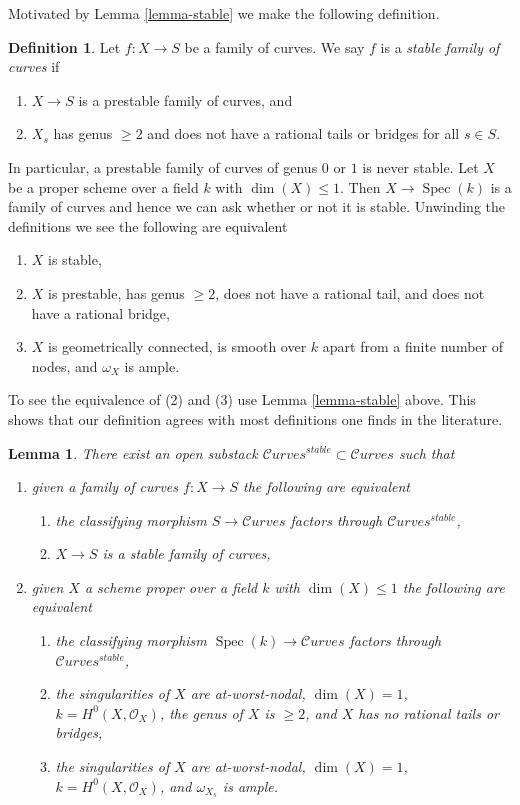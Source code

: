 \documentclass{stacks-project}
\theoremstyle{plain}
\newtheorem{lemma}[subsection]{Lemma}
\theoremstyle{definition}
\newtheorem{definition}[subsection]{Definition}
\theoremstyle{remark}
\numberwithin{equation}{subsection}
\def\Spec{\mathop{\mathrm{Spec}}}
\def\Curvesstack{\mathcal{C}\!\mathit{urves}}
\begin{document}
\noindent
Motivated by Lemma \ref{lemma-stable} we make the following definition.

\begin{definition}
\label{definition-stable}
Let $f : X \to S$ be a family of curves.
We say $f$ is a {\it stable family of curves} if
\begin{enumerate}
\item $X \to S$ is a prestable family of curves, and
\item $X_s$ has genus $\geq 2$ and does not have a rational tails
or bridges for all $s \in S$.
\end{enumerate}
\end{definition}

\noindent
In particular, a prestable family of curves of genus $0$ or $1$ is never
stable.
Let $X$ be a proper scheme over a field $k$ with $\dim(X) \leq 1$.
Then $X \to \Spec(k)$ is a family of curves and hence we can ask
whether or not it is stable. Unwinding the definitions we see
the following are equivalent
\begin{enumerate}
\item $X$ is stable,
\item $X$ is prestable, has genus $\geq 2$, does not have a rational tail,
and does not have a rational bridge,
\item $X$ is geometrically connected, is smooth over $k$
apart from a finite number of nodes, and $\omega_X$ is ample.
\end{enumerate}
To see the equivalence of (2) and (3) use
Lemma \ref{lemma-stable} above.
This shows that our definition agrees with most definitions one finds
in the literature.

\begin{lemma}
\label{lemma-stable-curves}
There exist an open substack $\Curvesstack^{stable} \subset \Curvesstack$
such that
\begin{enumerate}
\item given a family of curves $f : X \to S$ the following are equivalent
\begin{enumerate}
\item the classifying morphism $S \to \Curvesstack$ factors
through $\Curvesstack^{stable}$,
\item $X \to S$ is a stable family of curves,
\end{enumerate}
\item given $X$ a scheme proper over a field $k$ with
$\dim(X) \leq 1$ the following are equivalent
\begin{enumerate}
\item the classifying morphism $\Spec(k) \to \Curvesstack$
factors through $\Curvesstack^{stable}$,
\item the singularities of $X$ are at-worst-nodal, $\dim(X) = 1$,
$k = H^0(X, \mathcal{O}_X)$, the genus of $X$ is $\geq 2$, and
$X$ has no rational tails or bridges,
\item the singularities of $X$ are at-worst-nodal, $\dim(X) = 1$,
$k = H^0(X, \mathcal{O}_X)$, and $\omega_{X_s}$ is ample.
\end{enumerate}
\end{enumerate}
\end{lemma}
\end{document}

